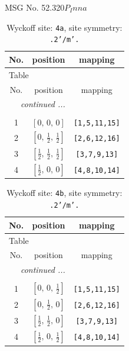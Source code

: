 \documentclass[fleqn,8pt]{jsarticle}
\begin{document}
\setcounter{MaxMatrixCols}{32}

\renewcommand{\tablename}{Table~}
\renewcommand{\figurename}{Figure~}
\begin{center}
\LARGE
MSG No. 52.320\quad$P_{I}nna$
\end{center}
\renewcommand{\arraystretch}{1.2}
\begin{longtable}{ccc}
\caption{Wyckoff site: {\tt 4a}, site symmetry: {\tt .2'/m'.}}
 \\
 \hline \hline
No. & position & mapping \\ \hline \endfirsthead

\multicolumn{2}{l}{\tablename\ \thetable{}} \\
 \hline \hline
No. & position & mapping \\ \hline \endhead

 \hline \hline
\multicolumn{2}{r}{\footnotesize\it continued ...} \\ \endfoot

 \hline \hline
\multicolumn{2}{r}{} \\ \endlastfoot

1 & $\left[ 0,\, 0,\, 0 \right]$ & {\tt [1,5,11,15]} \\ \hline
2 & $\left[ 0,\, \frac{1}{2},\, \frac{1}{2} \right]$ & {\tt [2,6,12,16]} \\ \hline
3 & $\left[ \frac{1}{2},\, \frac{1}{2},\, \frac{1}{2} \right]$ & {\tt [3,7,9,13]} \\ \hline
4 & $\left[ \frac{1}{2},\, 0,\, 0 \right]$ & {\tt [4,8,10,14]} \\
\end{longtable}
\renewcommand{\arraystretch}{1.2}
\begin{longtable}{ccc}
\caption{Wyckoff site: {\tt 4b}, site symmetry: {\tt .2'/m'.}}
 \\
 \hline \hline
No. & position & mapping \\ \hline \endfirsthead

\multicolumn{2}{l}{\tablename\ \thetable{}} \\
 \hline \hline
No. & position & mapping \\ \hline \endhead

 \hline \hline
\multicolumn{2}{r}{\footnotesize\it continued ...} \\ \endfoot

 \hline \hline
\multicolumn{2}{r}{} \\ \endlastfoot

1 & $\left[ 0,\, 0,\, \frac{1}{2} \right]$ & {\tt [1,5,11,15]} \\ \hline
2 & $\left[ 0,\, \frac{1}{2},\, 0 \right]$ & {\tt [2,6,12,16]} \\ \hline
3 & $\left[ \frac{1}{2},\, \frac{1}{2},\, 0 \right]$ & {\tt [3,7,9,13]} \\ \hline
4 & $\left[ \frac{1}{2},\, 0,\, \frac{1}{2} \right]$ & {\tt [4,8,10,14]} \\
\end{longtable}
\end{document}
